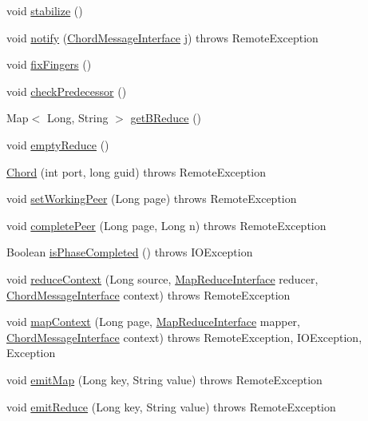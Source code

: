 \begin{DoxyCompactItemize}
\item 
void \mbox{\hyperlink{class_chord_a8a4b7a1cd88cb3f607ada0629f2ff2dd}{stabilize}} ()
\item 
void \mbox{\hyperlink{class_chord_a4de8b8464782dd96d88deeb35b2f27a2}{notify}} (\mbox{\hyperlink{interface_chord_message_interface}{Chord\+Message\+Interface}} j)  throws Remote\+Exception 
\item 
void \mbox{\hyperlink{class_chord_a02763f74bbd986baa7e6567bf9dc3c95}{fix\+Fingers}} ()
\item 
void \mbox{\hyperlink{class_chord_a530b2ab58c9f4026dadf4293c38c4450}{check\+Predecessor}} ()
\item 
Map$<$ Long, String $>$ \mbox{\hyperlink{class_chord_a2439783b411fe026b15a78ba6aeeb95f}{get\+B\+Reduce}} ()
\item 
void \mbox{\hyperlink{class_chord_a14ffe65b5fed6f1e10c5957fe6b9202a}{empty\+Reduce}} ()
\item 
\mbox{\hyperlink{class_chord_a6e4b3112b0268455fd599c57b5479791}{Chord}} (int port, long guid)  throws Remote\+Exception 
\item 
void \mbox{\hyperlink{class_chord_a20d48291de1f865e57a65852e95f7a5e}{set\+Working\+Peer}} (Long page)  throws Remote\+Exception
\item 
void \mbox{\hyperlink{class_chord_a0cc3d82d5173771fcbadb2ee6895d0f8}{complete\+Peer}} (Long page, Long n)  throws Remote\+Exception
\item 
Boolean \mbox{\hyperlink{class_chord_ad34d2c26167785d5d2ff741478367d03}{is\+Phase\+Completed}} ()  throws I\+O\+Exception
\item 
void \mbox{\hyperlink{class_chord_a8fef132c3b9323e35e6bca15153eda3e}{reduce\+Context}} (Long source, \mbox{\hyperlink{interface_map_reduce_interface}{Map\+Reduce\+Interface}} reducer, \mbox{\hyperlink{interface_chord_message_interface}{Chord\+Message\+Interface}} context)  throws Remote\+Exception     
\item 
void \mbox{\hyperlink{class_chord_a6fe57e7be47f45c0be7dfb59c23bb231}{map\+Context}} (Long page, \mbox{\hyperlink{interface_map_reduce_interface}{Map\+Reduce\+Interface}} mapper, \mbox{\hyperlink{interface_chord_message_interface}{Chord\+Message\+Interface}} context)  throws Remote\+Exception, I\+O\+Exception, Exception      
\item 
void \mbox{\hyperlink{class_chord_ad762227086fe020a1eeee133a8262b0d}{emit\+Map}} (Long key, String value)  throws Remote\+Exception     
\item 
void \mbox{\hyperlink{class_chord_af6d622a628500037eec2c4aee5274d40}{emit\+Reduce}} (Long key, String value)  throws Remote\+Exception     
\end{DoxyCompactItemize}
